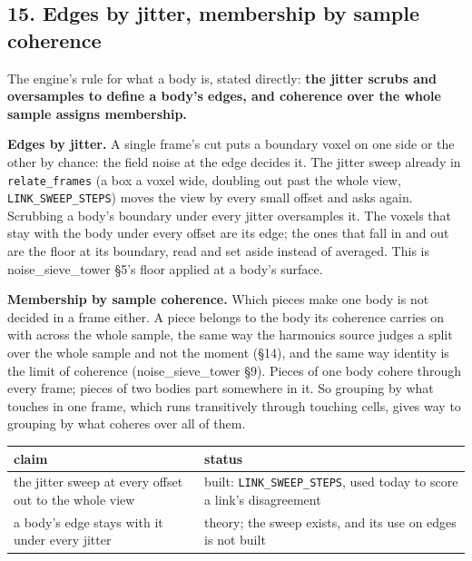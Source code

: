 \subsection{\texorpdfstring{15. Edges by jitter, membership by sample coherence}{15. Edges by jitter, membership by sample coherence}}

The engine's rule for what a body is, stated directly: \textbf{the jitter scrubs and oversamples to define a body's edges, and coherence over the whole sample assigns membership.}

\textbf{Edges by jitter.} A single frame's cut puts a boundary voxel on one side or the other by chance: the field noise at the edge decides it. The jitter sweep already in \texttt{relate\_\allowbreak{}frames} (a box a voxel wide, doubling out past the whole view, \texttt{LINK\_\allowbreak{}SWEEP\_\allowbreak{}STEPS}) moves the view by every small offset and asks again. Scrubbing a body's boundary under every jitter oversamples it. The voxels that stay with the body under every offset are its edge; the ones that fall in and out are the floor at its boundary, read and set aside instead of averaged. This is noise\_\allowbreak{}sieve\_\allowbreak{}tower §5's floor applied at a body's surface.

\textbf{Membership by sample coherence.} Which pieces make one body is not decided in a frame either. A piece belongs to the body its coherence carries on with across the whole sample, the same way the harmonics source judges a split over the whole sample and not the moment (§14), and the same way identity is the limit of coherence (noise\_\allowbreak{}sieve\_\allowbreak{}tower §9). Pieces of one body cohere through every frame; pieces of two bodies part somewhere in it. So grouping by what touches in one frame, which runs transitively through touching cells, gives way to grouping by what coheres over all of them.

{\small
\setlength{\tabcolsep}{6pt}
\begin{longtable}{>{\RaggedRight\arraybackslash}p{}>{\RaggedRight\arraybackslash}p{}}
\toprule
claim & status \\
\midrule
\endhead
the jitter sweep at every offset out to the whole view & built: \texttt{LINK\_\allowbreak{}SWEEP\_\allowbreak{}STEPS}, used today to score a link's disagreement \\
a body's edge stays with it under every jitter & theory; the sweep exists, and its use on edges is not built \\
\bottomrule
\end{longtable}
}

